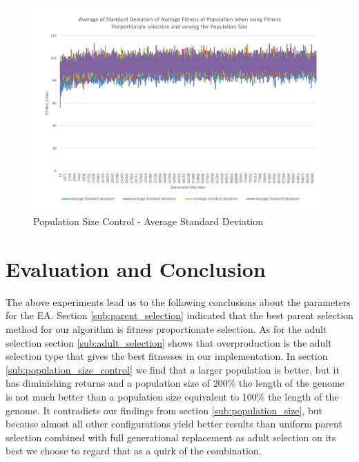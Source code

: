 \begin{figure}[thbp]
	\centerline{\includegraphics[width=\paperwidth]{figures/CircleTests/CirclePopulationSizeControllAverageStandardDeviation.pdf}}
	\caption{Population Size Control - Average Standard Deviation}
\end{figure}

\clearpage


\section{Evaluation and Conclusion} %
\label{sec:evaluation_and_conclusion}

The above experiments lead us to the following conclusions about the parameters for the EA. Section \ref{sub:parent_selection} indicated that the best parent selection method for our algorithm is fitness proportionate selection. As for the adult selection section \ref{sub:adult_selection} shows that overproduction is the adult selection type that gives the best fitnesses in our implementation. In section \ref{sub:population_size_control} we find that a larger population is better, but it has diminishing returns and a population size of 200\% the length of the genome is not much better than a population size equivalent to 100\% the length of the genome. It contradicts our findings from section \ref{sub:population_size}, but because almost all other configurations yield better results than uniform parent selection combined with full generational replacement as adult selection on its best we choose to regard that as a quirk of the combination.

